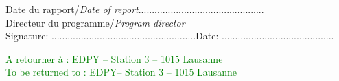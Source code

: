 \documentclass[11pt,titlepage]{article}
\begin{document}
\noindent Date du rapport/\textit{Date of report}\hspace{7cm}...............................................\\

\vspace{0.8cm}
\noindent Directeur du programme/\textit{Program director} \\

\noindent Signature: ......................................................\hspace{4cm}Date: ..........................................\\

\vspace{0.8cm}
\begin{center}
\textcolor{green}{A retourner à : EDPY – Station 3 – 1015 Lausanne\\
To be returned to : EDPY– Station 3 – 1015 Lausanne}
\end{center}
\end{document}
